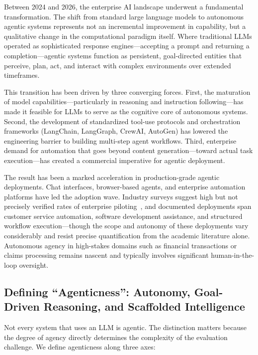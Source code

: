 \documentclass[11pt]{article}
\begin{document}
Between 2024 and 2026, the enterprise AI landscape underwent a fundamental transformation. The shift from standard large language models to autonomous agentic systems represents not an incremental improvement in capability, but a qualitative change in the computational paradigm itself. Where traditional LLMs operated as sophisticated response engines---accepting a prompt and returning a completion---agentic systems function as persistent, goal-directed entities that perceive, plan, act, and interact with complex environments over extended timeframes.

This transition has been driven by three converging forces. First, the maturation of model capabilities---particularly in reasoning and instruction following---has made it feasible for LLMs to serve as the cognitive core of autonomous systems. Second, the development of standardized tool-use protocols and orchestration frameworks (LangChain, LangGraph, CrewAI, AutoGen) has lowered the engineering barrier to building multi-step agent workflows. Third, enterprise demand for automation that goes beyond content generation---toward actual task execution---has created a commercial imperative for agentic deployment.

The result has been a marked acceleration in production-grade agentic deployments. Chat interfaces, browser-based agents, and enterprise automation platforms have led the adoption wave. Industry surveys suggest high but not precisely verified rates of enterprise piloting~\citep{mckinsey_agentic_ai}, and documented deployments span customer service automation, software development assistance, and structured workflow execution---though the scope and autonomy of these deployments vary considerably and resist precise quantification from the academic literature alone. Autonomous agency in high-stakes domains such as financial transactions or claims processing remains nascent and typically involves significant human-in-the-loop oversight.

\subsection{Defining ``Agenticness'': Autonomy, Goal-Driven Reasoning, and Scaffolded Intelligence}

Not every system that uses an LLM is agentic. The distinction matters because the degree of agency directly determines the complexity of the evaluation challenge. We define agenticness along three axes:
\end{document}
